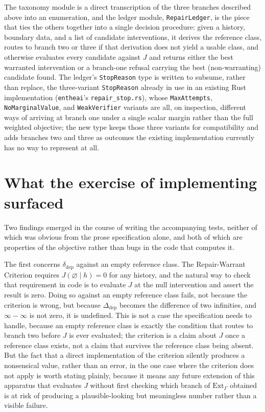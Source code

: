 \documentclass[11pt]{article}
\begin{document}
The taxonomy module is a direct transcription of the three branches described above into an enumeration, and the ledger module, \texttt{RepairLedger}, is the piece that ties the others together into a single decision procedure: given a history, boundary data, and a list of candidate interventions, it derives the reference class, routes to branch two or three if that derivation does not yield a usable class, and otherwise evaluates every candidate against $J$ and returns either the best warranted intervention or a branch-one refusal carrying the best (non-warranting) candidate found. The ledger's \texttt{StopReason} type is written to subsume, rather than replace, the three-variant \texttt{StopReason} already in use in an existing Rust implementation (\texttt{entheai}'s \texttt{repair\_stop.rs}), whose \texttt{MaxAttempts}, \texttt{NoMarginalValue}, and \texttt{WeakVerifier} variants are all, on inspection, different ways of arriving at branch one under a single scalar margin rather than the full weighted objective; the new type keeps those three variants for compatibility and adds branches two and three as outcomes the existing implementation currently has no way to represent at all.

\section{What the exercise of implementing surfaced}

Two findings emerged in the course of writing the accompanying tests, neither of which was obvious from the prose specification alone, and both of which are properties of the objective rather than bugs in the code that computes it.

The first concerns $\delta_{\text{dep}}$ against an empty reference class. The Repair-Warrant Criterion requires $J(\varnothing \mid h) = 0$ for any history, and the natural way to check that requirement in code is to evaluate $J$ at the null intervention and assert the result is zero. Doing so against an empty reference class fails, not because the criterion is wrong, but because $\Delta_{\text{dep}}$ becomes the difference of two infinities, and $\infty - \infty$ is not zero, it is undefined. This is not a case the specification needs to handle, because an empty reference class is exactly the condition that routes to branch two before $J$ is ever evaluated; the criterion is a claim about $J$ once a reference class exists, not a claim that survives the reference class being absent. But the fact that a direct implementation of the criterion silently produces a nonsensical value, rather than an error, in the one case where the criterion does not apply is worth stating plainly, because it means any future extension of this apparatus that evaluates $J$ without first checking which branch of $\mathrm{Ext}_\Gamma$ obtained is at risk of producing a plausible-looking but meaningless number rather than a visible failure.
\end{document}
